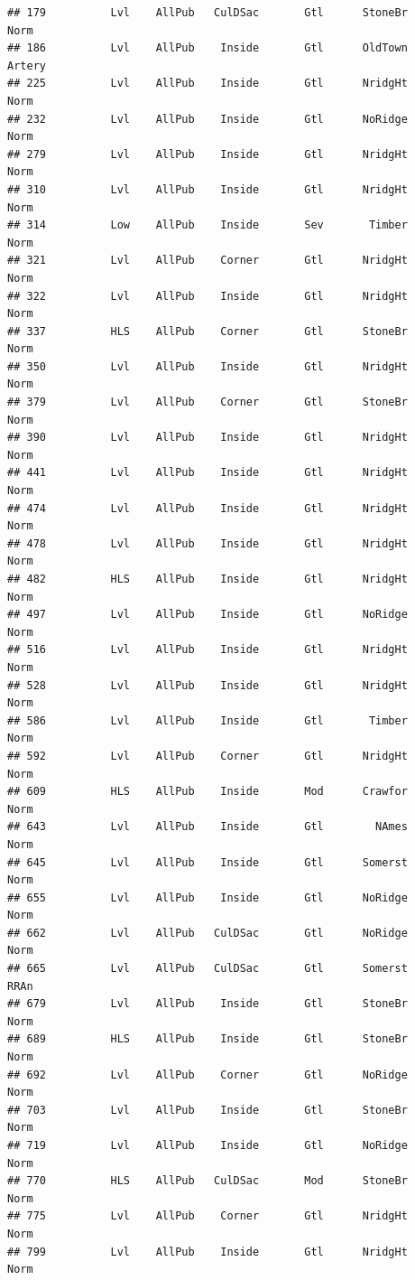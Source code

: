 \documentclass[]{article}
\begin{document}
\begin{verbatim}
## 179          Lvl    AllPub   CulDSac       Gtl      StoneBr       Norm
## 186          Lvl    AllPub    Inside       Gtl      OldTown     Artery
## 225          Lvl    AllPub    Inside       Gtl      NridgHt       Norm
## 232          Lvl    AllPub    Inside       Gtl      NoRidge       Norm
## 279          Lvl    AllPub    Inside       Gtl      NridgHt       Norm
## 310          Lvl    AllPub    Inside       Gtl      NridgHt       Norm
## 314          Low    AllPub    Inside       Sev       Timber       Norm
## 321          Lvl    AllPub    Corner       Gtl      NridgHt       Norm
## 322          Lvl    AllPub    Inside       Gtl      NridgHt       Norm
## 337          HLS    AllPub    Corner       Gtl      StoneBr       Norm
## 350          Lvl    AllPub    Inside       Gtl      NridgHt       Norm
## 379          Lvl    AllPub    Corner       Gtl      StoneBr       Norm
## 390          Lvl    AllPub    Inside       Gtl      NridgHt       Norm
## 441          Lvl    AllPub    Inside       Gtl      NridgHt       Norm
## 474          Lvl    AllPub    Inside       Gtl      NridgHt       Norm
## 478          Lvl    AllPub    Inside       Gtl      NridgHt       Norm
## 482          HLS    AllPub    Inside       Gtl      NridgHt       Norm
## 497          Lvl    AllPub    Inside       Gtl      NoRidge       Norm
## 516          Lvl    AllPub    Inside       Gtl      NridgHt       Norm
## 528          Lvl    AllPub    Inside       Gtl      NridgHt       Norm
## 586          Lvl    AllPub    Inside       Gtl       Timber       Norm
## 592          Lvl    AllPub    Corner       Gtl      NridgHt       Norm
## 609          HLS    AllPub    Inside       Mod      Crawfor       Norm
## 643          Lvl    AllPub    Inside       Gtl        NAmes       Norm
## 645          Lvl    AllPub    Inside       Gtl      Somerst       Norm
## 655          Lvl    AllPub    Inside       Gtl      NoRidge       Norm
## 662          Lvl    AllPub   CulDSac       Gtl      NoRidge       Norm
## 665          Lvl    AllPub   CulDSac       Gtl      Somerst       RRAn
## 679          Lvl    AllPub    Inside       Gtl      StoneBr       Norm
## 689          HLS    AllPub    Inside       Gtl      StoneBr       Norm
## 692          Lvl    AllPub    Corner       Gtl      NoRidge       Norm
## 703          Lvl    AllPub    Inside       Gtl      StoneBr       Norm
## 719          Lvl    AllPub    Inside       Gtl      NoRidge       Norm
## 770          HLS    AllPub   CulDSac       Mod      StoneBr       Norm
## 775          Lvl    AllPub    Corner       Gtl      NridgHt       Norm
## 799          Lvl    AllPub    Inside       Gtl      NridgHt       Norm

\end{verbatim}
\end{document}
